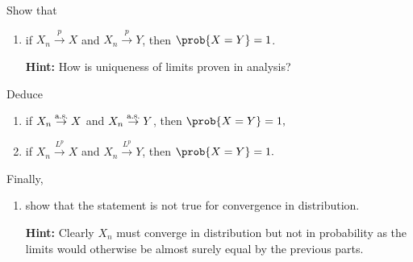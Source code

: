 
\begin{exercise}[subtitle={Stochastic limits are unique \Coffeecup\Coffeecup}]
    \label{ex: unique stochastic limits}
    Show that
    \begin{enumerate}[label=(\alph*),noitemsep]
        \item\label{it: (unique limits) stochastic}
        if \(X_n \overset{p}\to X\) and \(X_n \overset{p}\to Y\), then
        \(\prob{X = Y}=1\).

        \textbf{Hint:} How is uniqueness of limits proven in analysis?
    \end{enumerate}
    Deduce
    \begin{enumerate}[label=(\alph*), resume,noitemsep]
        \item\label{it: (unique limits) a.s.}
        if \(X_n \overset{\operatorname{\text{a.s.}}}\to X\) and \(X_n \overset{\operatorname{\text{a.s.}}}\to Y\), then \(\prob{X = Y}=1,\)

        \item\label{it: (unique limits) Lp}
        if \(X_n \overset{L^p}\to X\) and \(X_n \overset{L^p}\to Y\), then \(\prob{X = Y}=1.\)
    \end{enumerate}
    Finally, 
    \begin{enumerate}[label=(\alph*), resume, noitemsep]
        \item\label{it: non-unique limits convergence in dist} show that the statement is not true for convergence in
        distribution.

        \textbf{Hint:} Clearly \(X_n\) must converge in distribution but not
        in probability as the limits would otherwise be almost surely equal by the
        previous parts.
    \end{enumerate}
\end{exercise}
